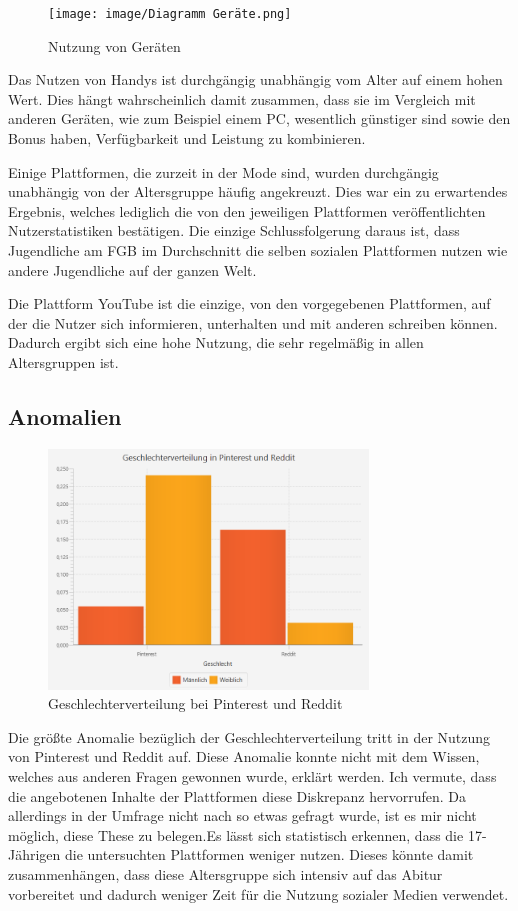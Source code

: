 \begin{figure}[!h]
    \centering
    \texttt{[image: image/Diagramm Geräte.png]}
    \caption{\label{imgs:diagramm_geraete_regelmaesigkeit}Nutzung von Geräten}
\end{figure}

Das Nutzen von Handys ist durchgängig unabhängig vom Alter auf einem hohen Wert. Dies hängt wahrscheinlich damit zusammen, dass sie im Vergleich mit anderen Geräten, wie zum Beispiel einem PC, wesentlich günstiger sind sowie den Bonus haben, Verfügbarkeit und Leistung zu kombinieren.

Einige Plattformen, die zurzeit in der Mode sind, wurden durchgängig unabhängig von der Altersgruppe häufig angekreuzt. Dies war ein zu erwartendes Ergebnis, welches lediglich die von den jeweiligen  Plattformen veröffentlichten Nutzerstatistiken bestätigen. Die einzige Schlussfolgerung daraus ist, dass Jugendliche am FGB im Durchschnitt die selben sozialen Plattformen nutzen wie andere Jugendliche auf der ganzen Welt.

Die Plattform YouTube ist die einzige, von den vorgegebenen Plattformen, auf der die Nutzer sich informieren, unterhalten und mit anderen schreiben können. Dadurch ergibt sich eine hohe Nutzung, die sehr regelmäßig in allen Altersgruppen ist.

\subsection{Anomalien}

\begin{figure}[!ht]
    \centering
    \includegraphics[width=8.5cm]{image/Diagramm Pinterst vs Reddit.png}
    \caption{\label{imgs:diagramm_pinterest_reddit}Geschlechterverteilung bei Pinterest und Reddit}
\end{figure}

Die größte Anomalie bezüglich der Geschlechterverteilung tritt in der Nutzung von Pinterest und Reddit auf. Diese Anomalie konnte nicht mit dem Wissen, welches aus anderen Fragen gewonnen wurde, erklärt werden. Ich vermute, dass die angebotenen Inhalte der Plattformen diese Diskrepanz hervorrufen. Da allerdings in der Umfrage nicht nach so etwas gefragt wurde, ist es mir nicht möglich, diese These zu belegen.Es lässt sich statistisch erkennen, dass die 17-Jährigen die untersuchten Plattformen weniger nutzen. Dieses könnte damit zusammenhängen, dass diese Altersgruppe sich intensiv auf das Abitur vorbereitet und dadurch weniger Zeit für die Nutzung sozialer Medien verwendet.

